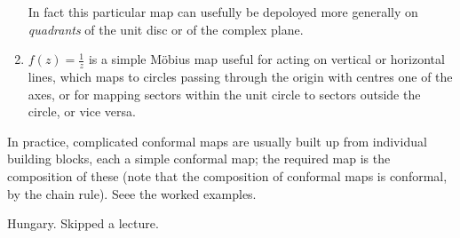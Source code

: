\documentclass[a4paper]{article}
\begin{document}
\begin{eg}
\begin{enumerate}
    In fact this particular map can usefully be depoloyed more generally on \emph{quadrants} of the unit disc or of the complex plane.
  \item \(f(z) = \frac{1}{z}\) is a simple Möbius map useful for acting on vertical or horizontal lines, which maps to circles passing through the origin with centres one of the axes, or for mapping sectors within the unit circle to sectors outside the circle, or vice versa.
  \end{enumerate}
\end{eg}

In practice, complicated conformal maps are usually built up from individual building blocks, each a simple conformal map; the required map is the composition of these (note that the composition of conformal maps is conformal, by the chain rule). Seee the worked examples.

Hungary. Skipped a lecture.
\end{document}

